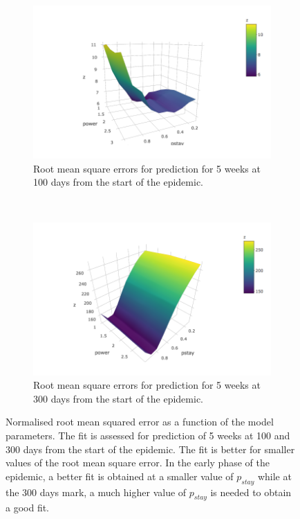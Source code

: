 \documentclass[11pt,]{article}
\begin{document}
\begin{figure}
  \centering
  \begin{subfigure}[b]{0.4\textwidth}
    \includegraphics[]{ms6-figures/rms-100-2}
    \caption{Root mean square errors for prediction for 5 weeks at 100 days from the start of the epidemic.}
    \label{fig:rms-100}
\end{subfigure}
~
  \begin{subfigure}[b]{0.4\textwidth}
    \includegraphics[]{ms6-figures/rms-300-2}
    \caption{Root mean square errors for prediction for 5 weeks at 300 days from the start of the epidemic.}    
    \label{fig:rms-300}
\end{subfigure}
  \caption[RMS as a function of model parameters]{Normalised root mean
    squared error as a function of the model parameters. The fit is
    assessed for prediction of 5 weeks at 100 and 300 days from the start of
    the epidemic. The fit is better for smaller values of the root
    mean square error. In the early phase of the epidemic, a better
    fit is obtained at a smaller value of $p_{stay}$ while at the 300
    days mark, a much higher value of $p_{stay}$ is needed to obtain a
  good fit.}
  \label{fig:rms}
\end{figure}
\FloatBarrier
\end{document}
